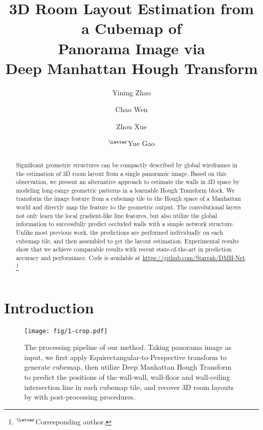 \documentclass[runningheads]{llncs}
\newcommand\blfootnote[1]{\begingroup
  \renewcommand\thefootnote{}\footnote{#1}\addtocounter{footnote}{-1}\endgroup
}
\begin{document}
\pagestyle{headings}
\mainmatter
\def\ECCVSubNumber{3606}  

\title{3D Room Layout Estimation from a Cubemap of\\ Panorama Image via\\ Deep Manhattan Hough Transform} 



\author{Yining Zhao \and
Chao Wen \and
Zhou Xue \and
$^\textrm{\Letter}$Yue Gao}

\maketitle

\begin{abstract}
   Significant geometric structures can be compactly described by global wireframes in the estimation of 3D room layout from a single panoramic image. Based on this observation, we present an alternative approach to estimate the walls in 3D space by modeling long-range geometric patterns in a learnable Hough Transform block. We transform the image feature from a cubemap tile to the Hough space of a Manhattan world and directly map the feature to the geometric output. The convolutional layers not only learn the local gradient-like line features, but also utilize the global information to successfully predict occluded walls with a simple network structure. Unlike most previous work, the predictions are performed individually on each cubemap tile, and then assembled to get the layout estimation. Experimental results show that we achieve comparable results with recent state-of-the-art in prediction accuracy and performance.
   Code is available at \url{https://github.com/Starrah/DMH-Net}.\blfootnote{\noindent$^\textrm{\Letter}$Corresponding author.}


\end{abstract}
\normalem
\section{Introduction}
\label{sec:intro}

\begin{figure*}[!h]
	\centering
	\texttt{[image: fig/1-crop.pdf]}
	\caption{The processing pipeline of our method. Taking panorama image as input, we first apply Equirectangular-to-Perspective transform to generate cubemap, then utilize Deep Manhattan Hough Transform to predict the positions of the wall-wall, wall-floor and wall-ceiling intersection line in each cubemap tile, and recover 3D room layouts by with post-processing procedures.
	}
	\label{fig:pipeline} 
\end{figure*}
\end{document}

